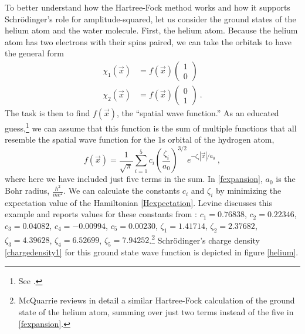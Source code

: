 \documentclass[onecolumn,secnumarabic,amsmath,amssymb,balancelastpage,nofootinbib]{article}
\begin{document}
To better understand how the Hartree-Fock method works and how it supports Schr\"{o}dinger's role for amplitude-squared, let us consider the ground states of the helium atom and the water molecule.  First, the helium atom.  Because the helium atom has two electrons with their spins paired, we can take the orbitals to have the general form
\begin{align}
\chi_1(\vec{x})&=f(\vec{x})\left(
\begin{matrix}
1 \\
0
\end{matrix}
\right)
\nonumber
\\
\chi_2(\vec{x})&=f(\vec{x})\left(
\begin{matrix}
0 \\
1
\end{matrix}
\right)
\ .
\label{twoorbitals}
\end{align}
The task is then to find $f(\vec{x})$, the ``spatial wave function.''  As an educated guess,\footnote{See \cite[sec.\ 9.4 and 11.1]{levineQC}.} we can assume that this function is the sum of multiple functions that all resemble the spatial wave function for the 1s orbital of the hydrogen atom,
\begin{equation}
f(\vec{x})=\frac{1}{\sqrt{\pi}} \sum_{i=1}^{5} c_i \left(\frac{\zeta_i}{a_0}\right)^{3/2}e^{-\zeta_i |\vec{x}| / a_0}\ ,
\label{fexpansion}
\end{equation}
where here we have included just five terms in the sum.  In \eqref{fexpansion}, $a_0$ is the Bohr radius, $\frac{\hbar^2}{m e^2}$.  We can calculate the constants $c_i$ and $\zeta_i$ by minimizing the expectation value of the Hamiltonian \eqref{Hexpectation}.  Levine \cite[sec.\ 11.1]{levineQC} discusses this example and reports values for these constants from \cite{clementi1974}: $c_1=0.76838$, $c_2=0.22346$, $c_3=0.04082$, $c_4=-0.00994$, $c_5=0.00230$, $\zeta_1=1.41714$, $\zeta_2=2.37682$, $\zeta_3=4.39628$, $\zeta_4=6.52699$, $\zeta_5=7.94252$.\footnote{McQuarrie \cite[pg.\ 482--489]{mcquarrieQC} reviews in detail a similar Hartree-Fock calculation of the ground state of the helium atom, summing over just two terms instead of the five in \eqref{fexpansion}.}  Schr\"{o}dinger's charge density \eqref{chargedensity1} for this ground state wave function is depicted in figure \ref{helium}.
\end{document}
